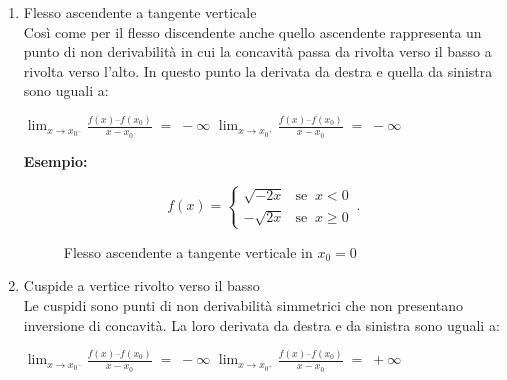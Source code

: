 \documentclass[a4paper,12pt]{report}
\begin{document}
\begin{enumerate}
\item {Flesso ascendente a tangente verticale}\\
Così come per il flesso discendente anche quello ascendente rappresenta un punto di non derivabilità in cui la concavità passa da rivolta verso il basso a rivolta verso l’alto.
In questo punto la derivata da destra e quella da sinistra sono uguali a: \\
\begin{center}
$\lim_{x\to x_{0^-}}\frac{f(x) – f(x_{0})}{x-x_{0}} \;=\; -\infty$ \qquad
$\lim_{x\to x_{0^+}}\frac{f(x) – f(x_{0})}{x-x_{0}} \;=\; -\infty$
\end{center}
\textbf{Esempio:} \\

\begin{center}
\begin{equation}
	 f(x) = 
      \begin{cases}
        \sqrt{-2x} & \text{se}\;\; x < 0\\
        -\sqrt{2x} & \text{se}\;\; x \geq 0
      \end{cases}\,.
\end{equation}
\end{center}

\begin{figure}[!h]
\begin{center}
	\caption{Flesso ascendente a tangente verticale in $x_{0} = 0$}
\end{center}
\end{figure}

\item {Cuspide a vertice rivolto verso il basso}\\
Le cuspidi sono punti di non derivabilità simmetrici che non presentano inversione di concavità. La loro derivata da destra e da sinistra sono uguali a: \\
\begin{center}
$\lim_{x\to x_{0^-}}\frac{f(x) – f(x_{0})}{x-x_{0}} \;=\; -\infty$ \qquad
$\lim_{x\to x_{0^+}}\frac{f(x) – f(x_{0})}{x-x_{0}} \;=\; +\infty$
\end{center}


\end{enumerate}
\end{document}
